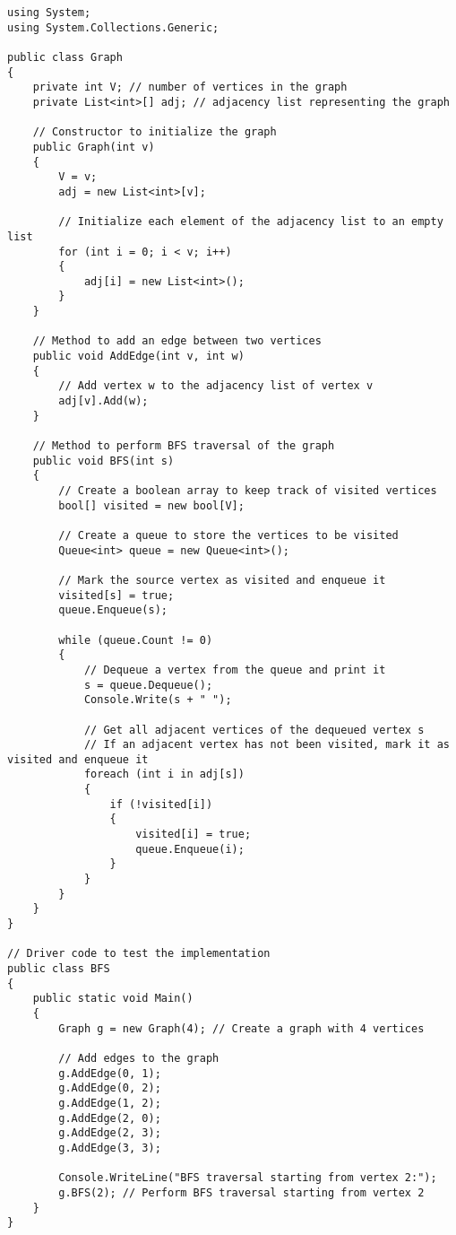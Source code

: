 \documentclass[12pt]{article}
\begin{document}
\begin{lstlisting}
using System;
using System.Collections.Generic;

public class Graph
{
    private int V; // number of vertices in the graph
    private List<int>[] adj; // adjacency list representing the graph

    // Constructor to initialize the graph
    public Graph(int v)
    {
        V = v;
        adj = new List<int>[v];

        // Initialize each element of the adjacency list to an empty list
        for (int i = 0; i < v; i++)
        {
            adj[i] = new List<int>();
        }
    }

    // Method to add an edge between two vertices
    public void AddEdge(int v, int w)
    {
        // Add vertex w to the adjacency list of vertex v
        adj[v].Add(w);
    }

    // Method to perform BFS traversal of the graph
    public void BFS(int s)
    {
        // Create a boolean array to keep track of visited vertices
        bool[] visited = new bool[V];

        // Create a queue to store the vertices to be visited
        Queue<int> queue = new Queue<int>();

        // Mark the source vertex as visited and enqueue it
        visited[s] = true;
        queue.Enqueue(s);

        while (queue.Count != 0)
        {
            // Dequeue a vertex from the queue and print it
            s = queue.Dequeue();
            Console.Write(s + " ");

            // Get all adjacent vertices of the dequeued vertex s
            // If an adjacent vertex has not been visited, mark it as visited and enqueue it
            foreach (int i in adj[s])
            {
                if (!visited[i])
                {
                    visited[i] = true;
                    queue.Enqueue(i);
                }
            }
        }
    }
}

// Driver code to test the implementation
public class BFS
{
    public static void Main()
    {
        Graph g = new Graph(4); // Create a graph with 4 vertices

        // Add edges to the graph
        g.AddEdge(0, 1);
        g.AddEdge(0, 2);
        g.AddEdge(1, 2);
        g.AddEdge(2, 0);
        g.AddEdge(2, 3);
        g.AddEdge(3, 3);

        Console.WriteLine("BFS traversal starting from vertex 2:");
        g.BFS(2); // Perform BFS traversal starting from vertex 2
    }
}
\end{lstlisting}
\end{document}
